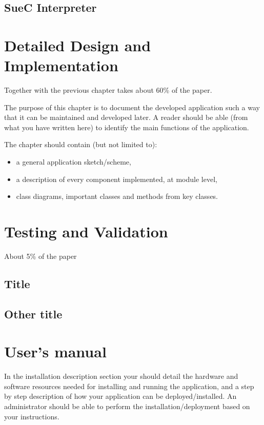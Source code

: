 \documentclass[12pt,a4paper,twoside]{report}
\begin{document}
	
\section{SueC Interpreter}

\chapter{Detailed Design and Implementation}

Together with the previous chapter takes about 60\% of the paper.

The purpose of this chapter is to document the developed application such a way that it can be maintained and developed later. A reader should be able (from what you have written here) to identify the main functions of the application.

The chapter should contain (but not limited to):
\begin{itemize}
 \item a general application sketch/scheme,
\item a description of every component implemented, at module level,
\item class diagrams, important classes and methods from key classes.
\end{itemize}

\chapter{Testing and Validation}

About 5\% of the paper
\section{Title}
\section{Other title}

\chapter{User's manual}

In the installation description section your should detail the hardware and software resources needed for installing and running the application, and a step by step description of how your application can be deployed/installed. An administrator should be able to perform the installation/deployment based on your instructions.
\end{document}
